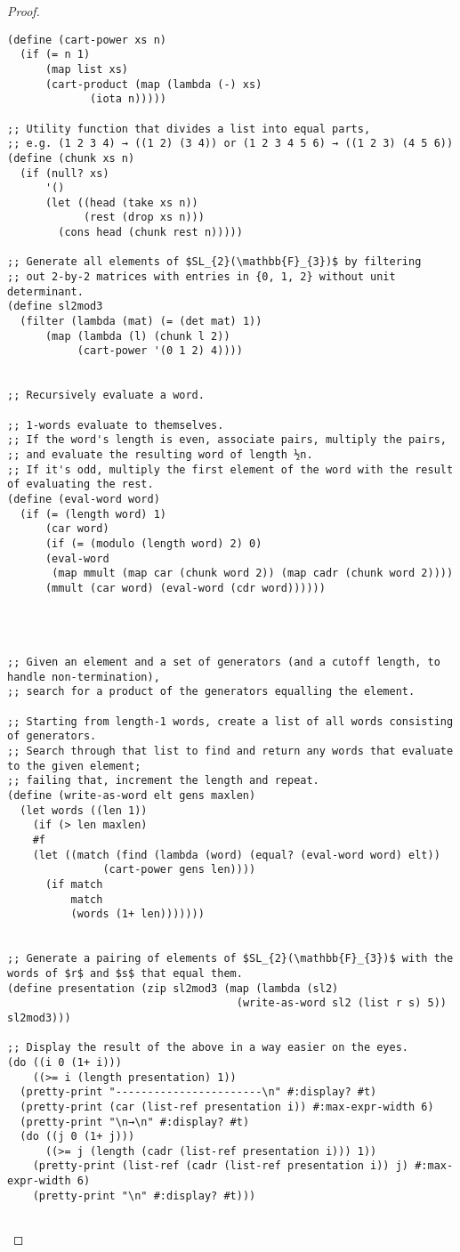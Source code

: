 \documentclass{article}
\begin{document}
\begin{proof}
\begin{verbatim}
(define (cart-power xs n)
  (if (= n 1)
      (map list xs)
      (cart-product (map (lambda (-) xs)
			 (iota n)))))

;; Utility function that divides a list into equal parts,
;; e.g. (1 2 3 4) → ((1 2) (3 4)) or (1 2 3 4 5 6) → ((1 2 3) (4 5 6))
(define (chunk xs n)
  (if (null? xs)
      '()
      (let ((head (take xs n))
            (rest (drop xs n)))
        (cons head (chunk rest n)))))

;; Generate all elements of $SL_{2}(\mathbb{F}_{3})$ by filtering
;; out 2-by-2 matrices with entries in {0, 1, 2} without unit determinant.
(define sl2mod3
  (filter (lambda (mat) (= (det mat) 1))
	  (map (lambda (l) (chunk l 2))
	       (cart-power '(0 1 2) 4))))


;; Recursively evaluate a word.

;; 1-words evaluate to themselves.
;; If the word's length is even, associate pairs, multiply the pairs,
;; and evaluate the resulting word of length ½n.
;; If it's odd, multiply the first element of the word with the result of evaluating the rest.
(define (eval-word word)
  (if (= (length word) 1)
      (car word)
      (if (= (modulo (length word) 2) 0)
	  (eval-word
	   (map mmult (map car (chunk word 2)) (map cadr (chunk word 2))))
	  (mmult (car word) (eval-word (cdr word))))))




;; Given an element and a set of generators (and a cutoff length, to handle non-termination),
;; search for a product of the generators equalling the element.

;; Starting from length-1 words, create a list of all words consisting of generators.
;; Search through that list to find and return any words that evaluate to the given element;
;; failing that, increment the length and repeat.
(define (write-as-word elt gens maxlen)
  (let words ((len 1))
    (if (> len maxlen)
	#f
	(let ((match (find (lambda (word) (equal? (eval-word word) elt))
			   (cart-power gens len))))
	  (if match
	      match
	      (words (1+ len)))))))


;; Generate a pairing of elements of $SL_{2}(\mathbb{F}_{3})$ with the words of $r$ and $s$ that equal them.
(define presentation (zip sl2mod3 (map (lambda (sl2)
                                    (write-as-word sl2 (list r s) 5)) sl2mod3)))

;; Display the result of the above in a way easier on the eyes.
(do ((i 0 (1+ i)))
    ((>= i (length presentation) 1))
  (pretty-print "-----------------------\n" #:display? #t)
  (pretty-print (car (list-ref presentation i)) #:max-expr-width 6)
  (pretty-print "\n→\n" #:display? #t)
  (do ((j 0 (1+ j)))
      ((>= j (length (cadr (list-ref presentation i))) 1))
    (pretty-print (list-ref (cadr (list-ref presentation i)) j) #:max-expr-width 6)
    (pretty-print "\n" #:display? #t)))


\end{verbatim}
\end{proof}
\end{document}
